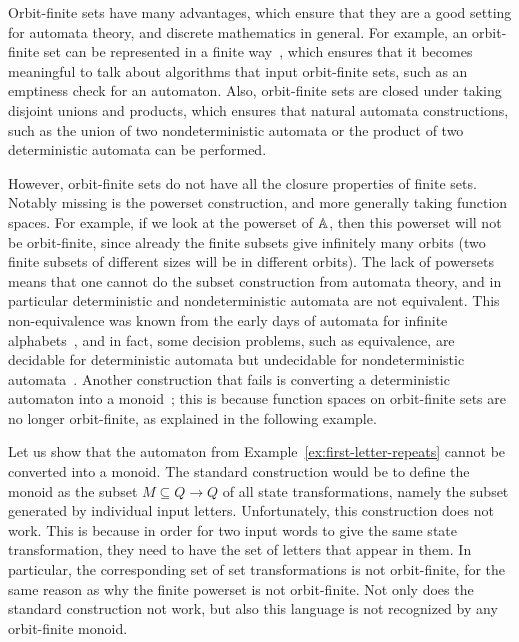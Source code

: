 Orbit-finite sets have many advantages, which ensure that they are a good setting for automata theory, and discrete mathematics in general. For example, an orbit-finite set can be represented in a finite way~\cite{bojanczyk_slightly2018}, which ensures that it becomes meaningful to talk about algorithms that input orbit-finite sets, such as an emptiness check for an automaton. Also, orbit-finite sets are closed under taking disjoint unions and products, which ensures that natural automata constructions, such as the union of two nondeterministic automata or the product of two deterministic automata can be performed.

However, orbit-finite sets do not have all the closure properties of finite sets. Notably missing is the powerset construction, and more generally taking function spaces. For example, if we look at the powerset of $\mathbb A$, then this powerset will not be orbit-finite, since already the finite subsets give infinitely many orbits (two finite subsets of different sizes will be in different orbits). The lack of powersets means that one cannot do the subset construction from automata theory, and in particular deterministic and nondeterministic automata are not equivalent. This non-equivalence was known from the early days of automata for infinite alphabets~\cite{kaminskiFiniteMemoryAutomata1994}, and in fact, some decision problems, such as equivalence, are decidable for deterministic automata but undecidable for nondeterministic automata~\cite{nevenFiniteStateMachines2004}. Another construction that fails is converting a deterministic automaton into a monoid~\cite[p.~221]{bojanczykNominalMonoids2013}; this is because function spaces on orbit-finite sets are no longer orbit-finite, as explained in the following example. 

\begin{example}\label{ex:first-letter-repeats-monoid}
    Let us show that the  automaton from Example~\ref{ex:first-letter-repeats} cannot be converted into a monoid. The standard construction would be to define the monoid as the subset $M \subseteq Q \to Q$ of all state transformations, namely the subset generated by individual input letters. 
    Unfortunately, this construction does not work. This is because in order  for  two input words to give the same state transformation, they need to have the set of letters that appear in them. In particular, the corresponding set of set transformations is not orbit-finite, for the same reason as why the finite powerset is not orbit-finite. Not only does the standard construction not work, but also this language is not recognized by any orbit-finite monoid.\exampleend
\end{example}


